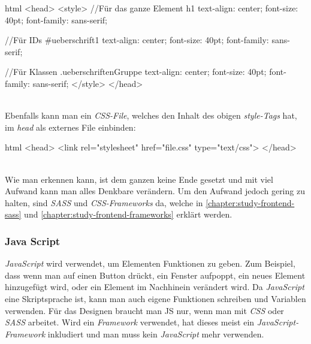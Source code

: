 		\begin{code}{html}
				<head>
					<style>
					//Für das ganze Element
					h1 {
						text-align: center; 
						font-size: 40pt; 
						font-family: sans-serif;
					}
				
					//Für IDs
					#ueberschrift1 {
						text-align: center; 
						font-size: 40pt; 
						font-family: sans-serif;
					}
					
					//Für Klassen
					.ueberschriftenGruppe {
						text-align: center; 
						font-size: 40pt; 
						font-family: sans-serif;
					}
					</style>
				</head>
		\end{code}
	\label{list:cssbsp} ~\\
		Ebenfalls kann man ein \textit{CSS-File}, welches den Inhalt des obigen \textit{style-Tags} hat, im \textit{head} als externes File einbinden:
		\begin{code}{html}
			<head>
				<link rel="stylesheet" href="file.css" type="text/css">
			</head>
		\end{code}
	\label{list:csslink} ~\\
		Wie man erkennen kann, ist dem ganzen keine Ende gesetzt und mit viel Aufwand kann man alles Denkbare verändern. Um den Aufwand jedoch gering zu halten, sind \textit{SASS} und \textit{CSS-Frameworks} da, welche in \autoref{chapter:study-frontend-sass} und \autoref{chapter:study-frontend-frameworks} erklärt werden.
		\subsubsection{Java Script}
		\label{chapter:study-frontend-js}
		\textit{JavaScript} wird verwendet, um Elementen Funktionen zu geben. Zum Beispiel, dass wenn man auf einen Button drückt, ein Fenster aufpoppt, ein neues Element hinzugefügt wird, oder ein Element im Nachhinein verändert wird. Da \textit{JavaScript} eine Skriptsprache ist, kann man auch eigene Funktionen schreiben und Variablen verwenden. Für das Designen braucht man JS nur, wenn man mit \textit{CSS} oder \textit{SASS} arbeitet. Wird ein \textit{Framework} verwendet, hat dieses meist ein \textit{JavaScript-Framework} inkludiert und man muss kein \textit{JavaScript} mehr verwenden.
